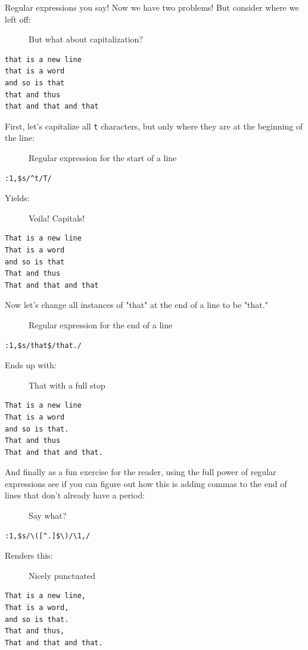 \documentclass[10pt,]{book}
\numberwithin{figure}{chapter}
\DeclareRobustCommand{\drcap}[1]{\begin{figure}[H]\caption{#1}\end{figure}}
\begin{document}
Regular expressions you say! Now we have two problems! But consider
where we left off:

\drcap{But what about capitalization?}

\begin{verbatim}
that is a new line
that is a word
and so is that
that and thus
that and that and that
\end{verbatim}

First, let's capitalize all \texttt{t} characters, but only where they
are at the beginning of the line:

\drcap{Regular expression for the start of a line}

\begin{verbatim}
:1,$s/^t/T/
\end{verbatim}

Yields:

\drcap{Voila! Capitals!}

\begin{verbatim}
That is a new line
That is a word
and so is that
That and thus
That and that and that
\end{verbatim}

Now let's change all instances of "that" at the end of a line to be
"that."

\drcap{Regular expression for the end of a line}

\begin{verbatim}
:1,$s/that$/that./
\end{verbatim}

Ends up with:

\drcap{That with a full stop}

\begin{verbatim}
That is a new line
That is a word
and so is that.
That and thus
That and that and that.
\end{verbatim}

And finally as a fun exercise for the reader, using the full power of
regular expressions see if you can figure out how this is adding commas
to the end of lines that don't already have a period:

\drcap{Say what?}

\begin{verbatim}
:1,$s/\([^.]$\)/\1,/
\end{verbatim}

Renders this:

\drcap{Nicely punctuated}

\begin{verbatim}
That is a new line,
That is a word,
and so is that.
That and thus,
That and that and that.
\end{verbatim}
\end{document}
